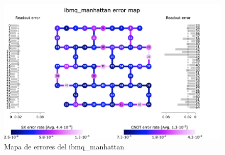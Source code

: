   \begin{figure}[H]
    \centering
    \includegraphics[width=\textwidth]{TFG/imagenes/system_error_manhattan.png}
    \caption{Mapa de errores del ibmq\_manhattan} 
    \label{FIG:MapaErrores}
 \end{figure}

 \vspace{20pt}


